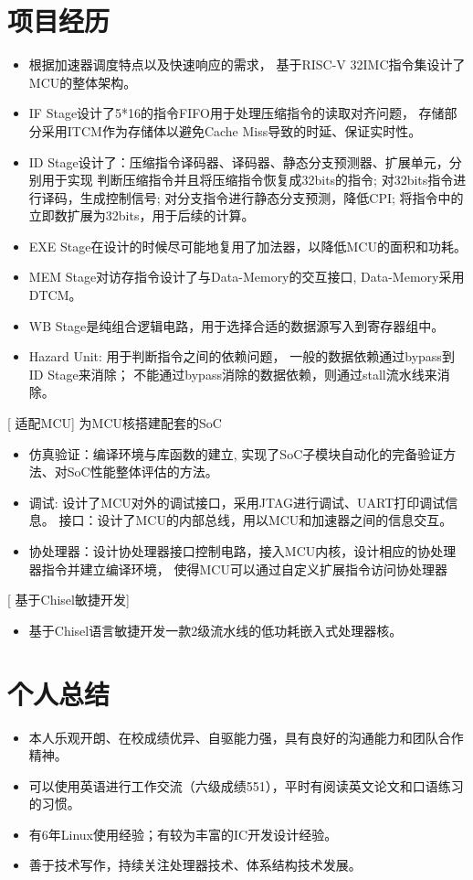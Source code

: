 \documentclass{resume}
\begin{document}
\section{项目经历}

\begin{itemize}
    \item 根据加速器调度特点以及快速响应的需求，
        基于RISC-V 32IMC指令集设计了MCU的整体架构。
    \item IF Stage设计了5*16的指令FIFO用于处理压缩指令的读取对齐问题，
        存储部分采用ITCM作为存储体以避免Cache Miss导致的时延、保证实时性。
    \item ID Stage设计了：压缩指令译码器、译码器、静态分支预测器、扩展单元，分别用于实现
           判断压缩指令并且将压缩指令恢复成32bits的指令;
           对32bits指令进行译码，生成控制信号;
           对分支指令进行静态分支预测，降低CPI;
           将指令中的立即数扩展为32bits，用于后续的计算。
    \item EXE Stage在设计的时候尽可能地复用了加法器，以降低MCU的面积和功耗。
    \item MEM Stage对访存指令设计了与Data-Memory的交互接口, Data-Memory采用DTCM。
    \item WB Stage是纯组合逻辑电路，用于选择合适的数据源写入到寄存器组中。
    \item Hazard Unit: 用于判断指令之间的依赖问题，
        一般的数据依赖通过bypass到ID Stage来消除；
        不能通过bypass消除的数据依赖，则通过stall流水线来消除。
\end{itemize}

[ 适配\textnormal{MCU}]
为MCU核搭建配套的SoC
\begin{itemize}
    \item 仿真验证：编译环境与库函数的建立, 
        实现了SoC子模块自动化的完备验证方法、对SoC性能整体评估的方法。
    \item 调试: 设计了MCU对外的调试接口，采用JTAG进行调试、UART打印调试信息。
        接口：设计了MCU的内部总线，用以MCU和加速器之间的信息交互。
    \item 协处理器：设计协处理器接口控制电路，接入MCU内核，设计相应的协处理器指令并建立编译环境，
        使得MCU可以通过自定义扩展指令访问协处理器
\end{itemize}

[ 基于\textnormal{Chisel}敏捷开发]
\begin{itemize}
  \item 基于Chisel语言敏捷开发一款2级流水线的低功耗嵌入式处理器核。 
\end{itemize}

\section{个人总结}
\begin{itemize}
    \item 本人乐观开朗、在校成绩优异、自驱能力强，具有良好的沟通能力和团队合作精神。
    \item 可以使用英语进行工作交流（六级成绩551），平时有阅读英文论文和口语练习的习惯。
    \item 有6年Linux使用经验；有较为丰富的IC开发设计经验。
    \item 善于技术写作，持续关注处理器技术、体系结构技术发展。
\end{itemize}
\end{document}
